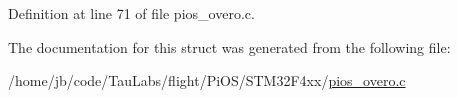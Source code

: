 \-Definition at line 71 of file pios\-\_\-overo.\-c.



\-The documentation for this struct was generated from the following file\-:\begin{DoxyCompactItemize}
\item 
/home/jb/code/\-Tau\-Labs/flight/\-Pi\-O\-S/\-S\-T\-M32\-F4xx/\hyperlink{pios__overo_8c}{pios\-\_\-overo.\-c}\end{DoxyCompactItemize}
